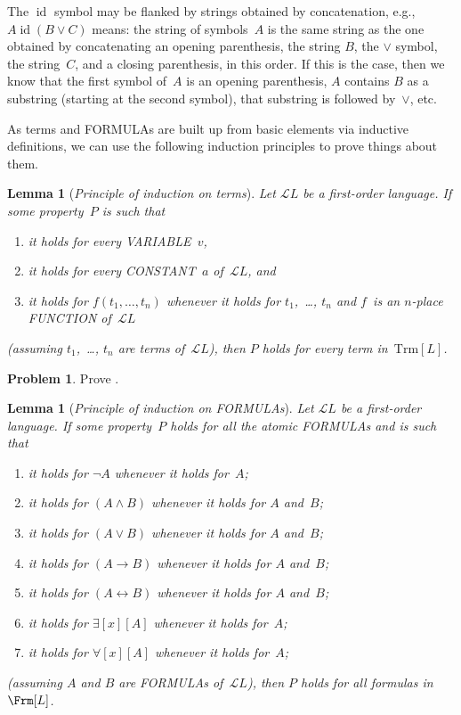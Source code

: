 \documentclass[10pt,a4paper]{article}
\makeatletter
\newcommand*{\olup}[1]{\MakeUppercase{#1}}
\theoremstyle{plain}
\newtheorem{lem}[thm]{Lemma}
\theoremstyle{definition}
\newtheorem{prob}{Problem}[section]
\theoremstyle{remark}
\newcommand*{\ollabel}[1]{\label{#1}}
\newcommand{\olref}{\@ifnextchar[{\olref@i}{\olref@final}}
\def\olref@i[#1]{\@ifnextchar[{\olref@ii}{\olref@final}}
\def\olref@ii[#1]{\@ifnextchar[{\olref@iii}{\olref@final}}
\def\olref@iii[#1]{\olref@final}
\def\olref@final#1{\ref{#1}}
\providecommand{\lif}{\mathbin{\rightarrow}}
\providecommand{\lforall}{\mathord{\forall}}
\providecommand{\lexists}{\mathord{\exists}}
\providecommand{\Lang}{\ensuremath{\mathcal{L}}}
\providecommand{\tagitem}[1]{\item[#1]}
\providecommand{\liff}{\mathbin{\leftrightarrow}}
\providecommand{\Trm}{\mathrm{Trm}}
\providecommand{\ident}{\operatorname{id}}
\makeatother
\begin{document}
The $\ident$ symbol may be flanked by strings obtained by
concatenation, e.g., $A \ident (B \lor C)$ means: the string of
symbols~$A$ is the same string as the one obtained by concatenating
an opening parenthesis, the string $B$, the $\lor$ symbol, the
string~$C$, and a closing parenthesis, in this order. If this is the
case, then we know that the first symbol of~$A$ is an opening
parenthesis, $A$ contains $B$ as a substring (starting at the second
symbol), that substring is followed by~$\lor$, etc.

As terms and \olup{formula}s are built up from basic elements via inductive
definitions, we can use the following induction principles to prove
things about them.

\begin{lem}[\emph{Principle of induction on terms}]
    \ollabel{lem:trmind}
    Let $\Lang L$ be a first-order language.
    If some property~$P$ is such that
    \begin{enumerate}
        \item it holds for every \olup{variable}~$v$,
        \item it holds for every \olup{constant}~$a$ of~$\Lang L$, and
        \item it holds for $f(t_1,\dotsc,t_n)$ whenever it holds for
        $t_1$,~\dots, $t_n$ and $f$~is an $n$-place
            \olup{function} of~$\Lang L$
    \end{enumerate}
    (assuming $t_1$,~\dots, $t_n$ are terms of~$\Lang{L}$),
    then $P$ holds for every term in~$\Trm[L]$.
\end{lem}

\begin{prob}
    Prove \olref[fol][syn][frm]{lem:trmind}.
\end{prob}

\begin{lem}[\emph{Principle of induction on \olup{formula}s}]
    \ollabel{thm:frmind}
    Let $\Lang L$ be a first-order language.
    If some property~$P$ holds for all the atomic \olup{formula}s
    and is such that
    \begin{enumerate}
        \tagitem{prvNot}{it holds for $\lnot A$ whenever it
            holds for~$A$;}{}
        \tagitem{prvAnd}{it holds for $(A \land B)$
            whenever it holds for $A$ and~$B$;}{}
        \tagitem{prvOr}{it holds for $(A \lor B)$
            whenever it holds for $A$ and~$B$;}{}
        \tagitem{prvIf}{it holds for $(A \lif B)$
            whenever it holds for $A$ and~$B$;}{}
        \tagitem{prvIff}{it holds for $(A \liff B)$
            whenever it holds for $A$ and~$B$;}{}
        \tagitem{prvEx}{it holds for $\lexists[x][A]$
            whenever it holds for~$A$;}{}
        \tagitem{prvAll}{it holds for $\lforall[x][A]$
            whenever it holds for~$A$;}{}
  \end{enumerate}
  (assuming $A$ and $B$ are \olup{formula}s of~$\Lang{L}$),
  then $P$ holds for all formulas in~$\Frm[L]$.
\end{lem}
\end{document}
